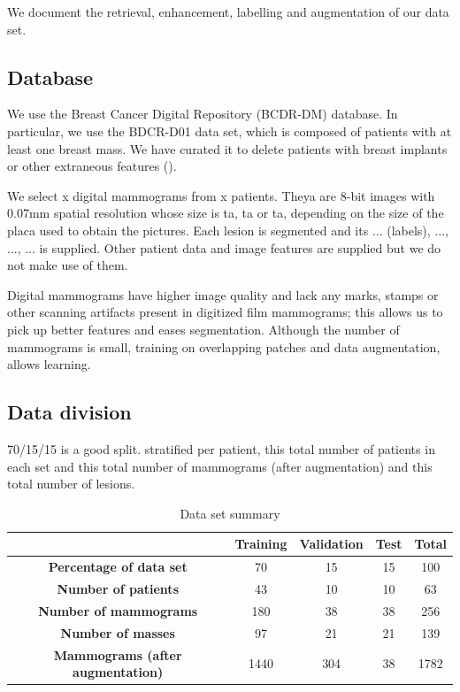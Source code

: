 We document the retrieval, enhancement, labelling and augmentation of our data set.

\subsection{Database}
We use the Breast Cancer Digital Repository (BCDR-DM) database. In particular, we use the BDCR-D01 data set, which is composed of patients with at least one breast mass. We have curated it to delete patients with breast implants or other extraneous features ().

We select x digital mammograms from x patients. Theya are 8-bit images with 0.07mm spatial resolution whose size is ta, ta or ta, depending on the size of the placa used to obtain the pictures. Each lesion is segmented and its ... (labels), ..., ..., ... is supplied. Other patient data and image features are supplied but we do not make use of them.

Digital mammograms have higher image quality and lack any marks, stamps or other scanning artifacts present in digitized film mammograms; this allows us to pick up better features and eases segmentation. Although the number of mammograms is small, training on overlapping patches and data augmentation, allows learning.


\subsection{Data division}
70/15/15 is a good split. stratified per patient, this total number of patients in each set and this total number of mammograms (after augmentation) and this total number of lesions.

\begin{table}[h]
	\centering
	\begin{tabular}{ccccc}
		\hline
		&\textbf{Training} & \textbf{Validation} & \textbf{Test} & \textbf{Total}\\
		\hline 
		\textbf{Percentage of data set}	&70	&15	&15	&100\\
		\textbf{Number of patients} &43&10&10&63\\
		\textbf{Number of mammograms} &180&38&38&256\\
		\textbf{Number of masses} &97&21&21&139\\
		\textbf{Mammograms (after augmentation)} &1440&304&38&1782\\
		\hline
	\end{tabular}
	\caption[Data set summary]{Data set summary}
\end{table}

